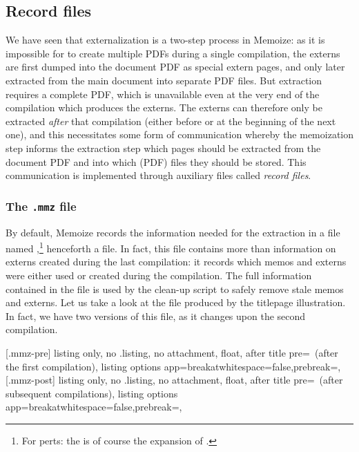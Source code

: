 \documentclass[a4paper,11pt]{article}
\begin{document}
\subsection{Record files}
\label{sec:record-files}

We have seen that externalization is a two-step process in Memoize: as it is
impossible for  to create multiple PDFs during a single
compilation, the externs are first dumped into the document PDF as special
extern pages, and only later extracted from the main document into separate PDF
files.  But extraction requires a complete PDF, which is unavailable even at
the very end of the compilation which produces the externs.  The externs can
therefore only be extracted \emph{after} that compilation (either before or at
the beginning of the next one), and this necessitates some form of
communication whereby the memoization step informs the extraction step which
pages should be extracted from the document PDF and into which (PDF) files they
should be stored.  This communication is implemented through auxiliary files
called \emph{record files}.

\subsubsection{The \texttt{.mmz} file}
\label{sec:.mmz}

By default, Memoize records the information needed for the extraction in a file
named \dmmz,\footnote{For perts: the
   is of course the expansion of .} henceforth
a \dmmz file.  In fact, this file contains more than information on externs
created during the last compilation: it records which memos and externs were
either used or created during the compilation.  The full information contained
in the \dmmz file is used by the clean-up script 
to safely remove stale memos and externs.  Let us take a look at the \dmmz file
produced by the titlepage illustration.  In fact, we have two versions of this
file, as it changes upon the second compilation.

[.mmz-pre]{
  listing only, no .listing, no attachment, float,
  after title pre={\ (after the first compilation)},
  listing options app={breakatwhitespace=false,prebreak=},
}
[.mmz-post]{
  listing only, no .listing, no attachment, float,
  after title pre={\ (after subsequent compilations)},
  listing options app={breakatwhitespace=false,prebreak=},
}
\end{document}
